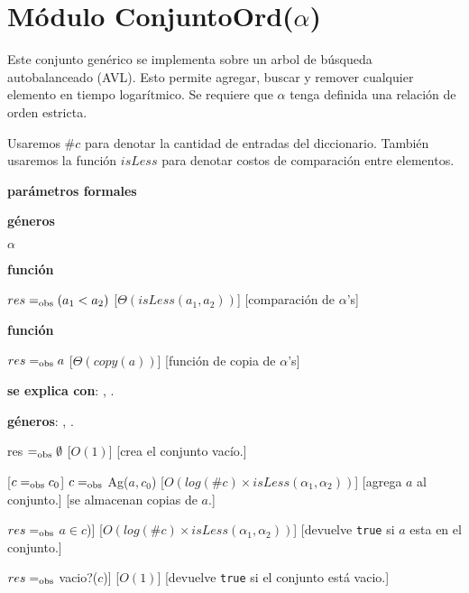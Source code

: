\section{Módulo ConjuntoOrd(\texorpdfstring{$\alpha$}{α})}

Este conjunto genérico se implementa sobre un arbol de búsqueda autobalanceado (AVL). Esto permite agregar, buscar y remover cualquier elemento en tiempo logarítmico. Se requiere que $\alpha$ tenga definida una relación de orden estricta.

Usaremos $\#c$ para denotar la cantidad de entradas del diccionario. También usaremos la función $isLess$ para denotar costos de comparación entre elementos.

\begin{Interfaz}

	\textbf{parámetros formales}\parindent\\
	\parbox{1.7cm}{\textbf{géneros}}$\alpha$\\
	\parbox[t]{1.7cm}{\textbf{función}}\parbox[t]{.5\textwidth-\parindent-1.7cm}{
		{$res =_{\mathrm{obs}} (a_1 < a_2)$}
		[$\Theta(isLess(a_1, a_2))$]
		[comparación de $\alpha$'s]
	}
	\parbox[t]{1.7cm}{\textbf{función}}\parbox[t]{.5\textwidth-\parindent-1.7cm}{
		{$res =_{\mathrm{obs}} a$}
		[$\Theta(copy(a))$]
		[función de copia de $\alpha$'s]
	}

	\textbf{se explica con}: , .

	\textbf{géneros}: , .


	{res $=_{\mathrm{obs}} \emptyset$ }
	[$O(1)$]
	[crea el conjunto vacío.]

	[$c =_{\mathrm{obs}} c_0$]
	{$c =_{\mathrm{obs}}$ Ag($a, c_0$)}
	[$O(log(\#c) \times isLess(\alpha_1, \alpha_2))$]
	[agrega $a$ al conjunto.]
	[se almacenan copias de $a$.]

	{$res =_{\mathrm{obs}}$ $a \in c$)]}
	[$O(log(\#c) \times isLess(\alpha_1, \alpha_2)) $]
	[devuelve \texttt{true} si $a$ esta en el conjunto.]

	{$res =_{\mathrm{obs}}$ vacio?($c$)]}
	[$O(1)$]
	[devuelve \texttt{true} si el conjunto está vacio.]


\end{Interfaz}
